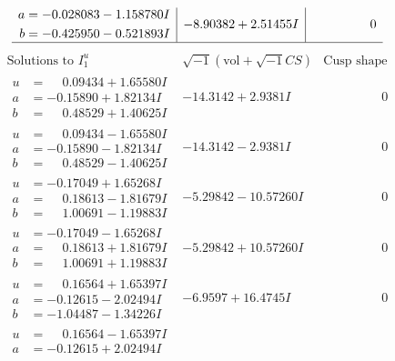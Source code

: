 \documentclass[1p]{elsarticle_modified}
\theoremstyle{definition}
\newcommand{\I}{\sqrt{-1}}
\begin{document}
$$\begin{array}{c|c|c}
\begin{aligned}
a &= -0.028083 - 1.158780 I \\
b &= -0.425950 - 0.521893 I\end{aligned}
 & -8.90382 + 2.51455 I & \phantom{-0.000000 } 0\\
 \hline 
 \end{array}$$\newpage$$\begin{array}{c|c|c}  
\text{Solutions to }I^u_{1}& \I (\text{vol} + \sqrt{-1}CS) & \text{Cusp shape}\\
 \hline 
\begin{aligned}
u &= \phantom{-}0.09434 + 1.65580 I \\
a &= -0.15890 + 1.82134 I \\
b &= \phantom{-}0.48529 + 1.40625 I\end{aligned}
 & -14.3142 + 2.9381 I & \phantom{-0.000000 } 0 \\ \hline\begin{aligned}
u &= \phantom{-}0.09434 - 1.65580 I \\
a &= -0.15890 - 1.82134 I \\
b &= \phantom{-}0.48529 - 1.40625 I\end{aligned}
 & -14.3142 - 2.9381 I & \phantom{-0.000000 } 0 \\ \hline\begin{aligned}
u &= -0.17049 + 1.65268 I \\
a &= \phantom{-}0.18613 - 1.81679 I \\
b &= \phantom{-}1.00691 - 1.19883 I\end{aligned}
 & -5.29842 - 10.57260 I & \phantom{-0.000000 } 0 \\ \hline\begin{aligned}
u &= -0.17049 - 1.65268 I \\
a &= \phantom{-}0.18613 + 1.81679 I \\
b &= \phantom{-}1.00691 + 1.19883 I\end{aligned}
 & -5.29842 + 10.57260 I & \phantom{-0.000000 } 0 \\ \hline\begin{aligned}
u &= \phantom{-}0.16564 + 1.65397 I \\
a &= -0.12615 - 2.02494 I \\
b &= -1.04487 - 1.34226 I\end{aligned}
 & -6.9597 + 16.4745 I & \phantom{-0.000000 } 0 \\ \hline\begin{aligned}
u &= \phantom{-}0.16564 - 1.65397 I \\
a &= -0.12615 + 2.02494 I \\

\end{aligned}
\end{array}$$
\end{document}
